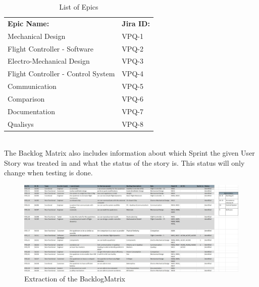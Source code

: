 \begin{table}[h]
\begin{center}
\caption{List of Epics}
\begin{tabular}{l|l}
     \rowcolor{cadetgrey} \textbf{Epic Name:}      & \textbf{Jira ID:} \\
                        Mechanical Design                       & VPQ-1 \\  
\rowcolor{gainsboro}    Flight Controller - Software            & VPQ-2 \\  
                        Electro-Mechanical Design               & VPQ-3 \\  
\rowcolor{gainsboro}    Flight Controller - Control System      & VPQ-4 \\  
                        Communication                           & VPQ-5 \\  
\rowcolor{gainsboro}    Comparison                              & VPQ-6 \\  
                        Documentation                           & VPQ-7 \\  
\rowcolor{gainsboro}    Qualisys                                & VPQ-8 \\ 
                           
\end{tabular}
\end{center}
\end{table}
\\ 
\noindent The Backlog Matrix also includes information about which Sprint the given User Story was treated in and what the status of the story is. This status will only change when testing is done.  

\begin{figure}[h]
    \centering
        \includegraphics[width = 1\textwidth]{VAPIQ-PICTURES/BacklogMatrix}
    \caption{Extraction of the BacklogMatrix}
    \label{fig:backlog}
\end{figure}

